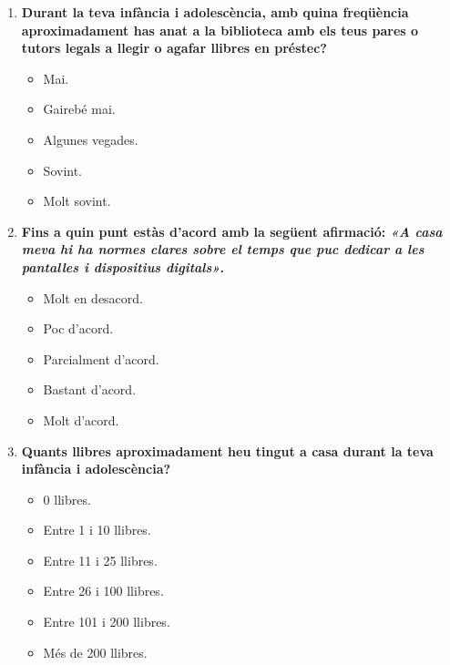 \documentclass[12pt]{article}
\begin{document}
\begin{enumerate}
    \item \textbf{Durant la teva infància i adolescència, amb quina freqüència aproximadament has anat a la biblioteca amb els teus pares o tutors legals a llegir o agafar llibres en préstec?}
    \begin{itemize}
        \item[$\square$] Mai.
        \item[$\square$] Gairebé mai.
        \item[$\square$] Algunes vegades.
        \item[$\square$] Sovint.
        \item[$\square$] Molt sovint.
    \end{itemize}

    \item \textbf{Fins a quin punt estàs d'acord amb la següent afirmació: \textit{«A casa meva hi ha normes clares sobre el temps que puc dedicar a les pantalles i dispositius digitals»}.}
    \begin{itemize}
        \item[$\square$] Molt en desacord.
        \item[$\square$] Poc d'acord.
        \item[$\square$] Parcialment d'acord.
        \item[$\square$] Bastant d'acord.
        \item[$\square$] Molt d'acord.
    \end{itemize}

    \item \textbf{Quants llibres aproximadament heu tingut a casa durant la teva infància i adolescència?}
    \begin{itemize}
        \item[$\square$] 0 llibres.
        \item[$\square$] Entre 1 i 10 llibres.
        \item[$\square$] Entre 11 i 25 llibres.
        \item[$\square$] Entre 26 i 100 llibres.
        \item[$\square$] Entre 101 i 200 llibres.
        \item[$\square$] Més de 200 llibres.
    \end{itemize}
\end{enumerate}
\end{document}
